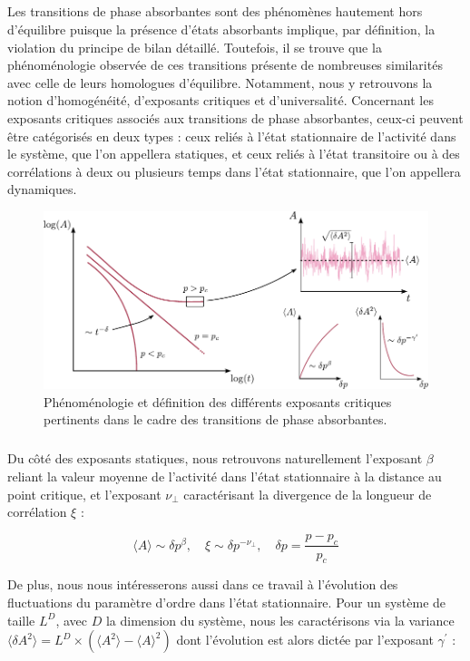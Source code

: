 \label{sec:tphiexp}

\subparagraph{}Les transitions de phase absorbantes sont des phénomènes hautement hors d'équilibre puisque la présence d'états absorbants implique, par définition, la violation du principe de bilan détaillé. Toutefois, il se trouve que la phénoménologie observée de ces transitions présente de nombreuses similarités avec celle de leurs homologues d'équilibre. Notamment, nous y retrouvons la notion d'homogénéité, d'exposants critiques et d'universalité. Concernant les exposants critiques associés aux transitions de phase absorbantes, ceux-ci peuvent être catégorisés en deux types : ceux reliés à l'état stationnaire de l'activité dans le système, que l'on appellera statiques, et ceux reliés à l'état transitoire ou à des corrélations à deux ou plusieurs temps dans l'état stationnaire, que l'on appellera dynamiques.

\begin{figure}[h]
	\centering
	\includegraphics[width=\textwidth]{Chapitre1/Figures/TphiAbs/expabs.pdf}
	\caption{Phénoménologie et définition des différents exposants critiques pertinents dans le cadre des transitions de phase absorbantes.}
	\label{fig:expabs}
\end{figure}

\subparagraph{}Du côté des exposants statiques, nous retrouvons naturellement l'exposant $\beta$ reliant la valeur moyenne de l'activité dans l'état stationnaire à la distance au point critique, et l'exposant $\nu_\perp$ caractérisant la divergence de la longueur de corrélation $\xi$ :

\begin{equation}
	\langle A \rangle \sim \delta p^\beta, \quad \xi \sim \delta p^{-\nu_\perp}, \quad \delta p =  \frac{p-p_c}{p_c}
\end{equation}

\noindent De plus, nous nous intéresserons aussi dans ce travail à l'évolution des fluctuations du paramètre d'ordre dans l'état stationnaire. Pour un système de taille $L^D$, avec $D$ la dimension du système, nous les caractérisons via la variance $\langle \delta A^2\rangle  = L^D\times(\langle A ^2 \rangle - \langle A \rangle^2)$ dont l'évolution est alors dictée par l'exposant $\gamma^\prime$ :

